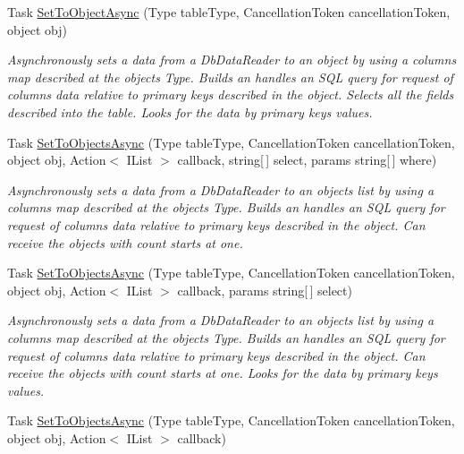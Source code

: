 \begin{DoxyCompactItemize}
Task \mbox{\hyperlink{interface_uniform_data_operator_1_1_sql_1_1_i_sql_operator_a497325acf359d4f8444ee0c2ff858e6e}{Set\+To\+Object\+Async}} (Type table\+Type, Cancellation\+Token cancellation\+Token, object obj)
\begin{DoxyCompactList}\small\item\em Asynchronously sets a data from a Db\+Data\+Reader to an object by using a columns map described at the object\textquotesingle{}s Type. Builds an handles an S\+QL query for request of columns data relative to primary keys described in the object. Selects all the fields described into the table. Looks for the data by primary keys values. \end{DoxyCompactList}\item 
Task \mbox{\hyperlink{interface_uniform_data_operator_1_1_sql_1_1_i_sql_operator_a396bf6c6d962ba910367755ad13d3d3c}{Set\+To\+Objects\+Async}} (Type table\+Type, Cancellation\+Token cancellation\+Token, object obj, Action$<$ I\+List $>$ callback, string\mbox{[}$\,$\mbox{]} select, params string\mbox{[}$\,$\mbox{]} where)
\begin{DoxyCompactList}\small\item\em Asynchronously sets a data from a Db\+Data\+Reader to an objects list by using a columns map described at the object\textquotesingle{}s Type. Builds an handles an S\+QL query for request of columns data relative to primary keys described in the object. Can receive the objects with count starts at one. \end{DoxyCompactList}\item 
Task \mbox{\hyperlink{interface_uniform_data_operator_1_1_sql_1_1_i_sql_operator_a277f97eaff18d7966e9b7ce00c171a0a}{Set\+To\+Objects\+Async}} (Type table\+Type, Cancellation\+Token cancellation\+Token, object obj, Action$<$ I\+List $>$ callback, params string\mbox{[}$\,$\mbox{]} select)
\begin{DoxyCompactList}\small\item\em Asynchronously sets a data from a Db\+Data\+Reader to an objects list by using a columns map described at the object\textquotesingle{}s Type. Builds an handles an S\+QL query for request of columns data relative to primary keys described in the object. Can receive the objects with count starts at one. Looks for the data by primary keys values. \end{DoxyCompactList}\item 
Task \mbox{\hyperlink{interface_uniform_data_operator_1_1_sql_1_1_i_sql_operator_ac8deb4d7a21d382b352b401f714deea9}{Set\+To\+Objects\+Async}} (Type table\+Type, Cancellation\+Token cancellation\+Token, object obj, Action$<$ I\+List $>$ callback)

\end{DoxyCompactItemize}
